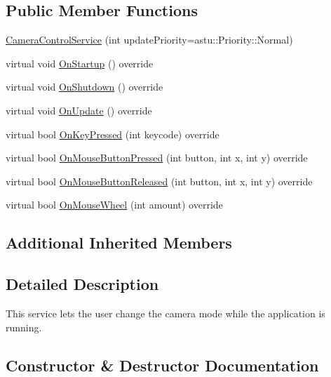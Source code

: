 \subsection*{Public Member Functions}
\begin{DoxyCompactItemize}
\item 
\hyperlink{classastu_1_1suite2d_1_1CameraControlService_a353fcc63a3b0086216d9096cb43d5d08}{Camera\+Control\+Service} (int update\+Priority=astu\+::\+Priority\+::\+Normal)
\item 
virtual void \hyperlink{classastu_1_1suite2d_1_1CameraControlService_a7965cdf848813b62aed86ecc8c34fcc8}{On\+Startup} () override
\item 
virtual void \hyperlink{classastu_1_1suite2d_1_1CameraControlService_aaf485c9ed16494fc52ce3ebe34b1e4d9}{On\+Shutdown} () override
\item 
virtual void \hyperlink{classastu_1_1suite2d_1_1CameraControlService_ab547e4f6103448db59d1350695bed4e8}{On\+Update} () override
\item 
virtual bool \hyperlink{classastu_1_1suite2d_1_1CameraControlService_aa0a09cd56307bfab4b410ed06ffa5c74}{On\+Key\+Pressed} (int keycode) override
\item 
virtual bool \hyperlink{classastu_1_1suite2d_1_1CameraControlService_aecd396dc1d0731e9b21b9dc148e4b96b}{On\+Mouse\+Button\+Pressed} (int button, int x, int y) override
\item 
virtual bool \hyperlink{classastu_1_1suite2d_1_1CameraControlService_a4d7ad40d697e2ee2a87303032ca19333}{On\+Mouse\+Button\+Released} (int button, int x, int y) override
\item 
virtual bool \hyperlink{classastu_1_1suite2d_1_1CameraControlService_a741757d88bd6f104c71fe8f5f1a7bd69}{On\+Mouse\+Wheel} (int amount) override
\end{DoxyCompactItemize}
\subsection*{Additional Inherited Members}


\subsection{Detailed Description}
This service lets the user change the camera mode while the application is running. 

\subsection{Constructor \& Destructor Documentation}
\mbox{\label{classastu_1_1suite2d_1_1CameraControlService_a353fcc63a3b0086216d9096cb43d5d08}} 

